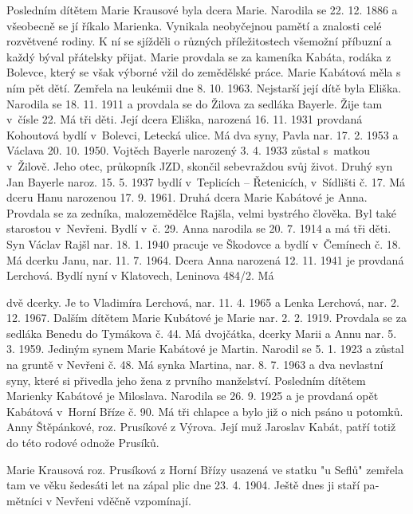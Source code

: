 \documentclass[../dejiny-rodu-prusiku.tex]{subfiles}
\begin{document}
Posledním dítětem Marie Krausové byla dcera Marie. Na­rodila se 22. 12. 1886 a všeobecně se jí říkalo Marienka. Vynikala neobyčejnou pamětí a znalosti celé rozvětvené rodiny. K ní se sjížděli o různých příležitostech všemožní příbuzní a každý býval přátelsky přijat. Marie provda­la se za kameníka Kabáta, rodáka z Bolevce, který se však výborné vžil do zemědělské práce. Marie Kabátová měla s ním pět dětí. Zemřela na leukémii dne 8. 10. 1963. Nejstarší její dítě byla Eliška. Narodila se 18. 11. 1911 a provdala se do Žilova za sedláka Bayerle. Žije tam v čísle 22. Má tři děti. Její dcera Eliška, narozená 16. 11. 1931 provdaná Kohoutová bydlí v Bolevci, Letecká ulice. Má dva syny, Pavla nar. 17. 2. 1953 a Václava 20. 10. 1950. Vojtěch Bayerle narozený 3. 4. 1933 zůstal s matkou v Žilově. Jeho otec, průkopník JZD, skončil sebevraždou svůj život. Druhý syn Jan Bayerle naroz. 15. 5. 1937 bydlí v Teplicích – Řetenicích, v Sídlišti č. 17. Má dceru Hanu narozenou 17. 9. 1961. Druhá dcera Marie Kabátové je Anna. Provdala se za zedníka, malozemědělce Rajšla, velmi bystrého člověka. Byl také starostou v Nevřeni. Bydlí v č. 29. Anna narodila se 20. 7. 1914 a má tři děti. Syn Václav Rajšl nar. 18. 1. 1940 pracuje ve Škodovce a bydlí v Čemínech č. 18. Má dcerku Janu, nar. 11. 7. 1964. Dcera Anna narozená 12. 11. 1941 je provdaná Lerchová. Bydlí nyní v Klatovech, Leninova 484/2. Má

dvě dcerky. Je to Vladimíra Lerchová, nar. 11. 4. 1965 a Lenka Lerchová, nar. 2. 12. 1967. Dalším dítětem Marie Kubátové je Marie  nar. 2. 2. 1919. Provdala se za sedláka Benedu do Tymákova č. 44. Má dvojčátka, dcerky Marii a Annu nar. 5. 3. 1959. Jediným synem Marie Kabá­tové je Martin. Narodil se 5. 1. 1923 a zůstal na gruntě v Nevřeni č. 48. Má synka Martina, nar. 8. 7. 1963 a dva nevlastní syny, které si přivedla jeho žena z prvního manželství. Posledním dítětem Marienky Kabátové je Miloslava. Narodila se 26. 9. 1925 a je provdaná opět Kabátová v Horní Bříze č. 90. Má tři chlapce a bylo již o nich psáno u potomků. Anny Štěpánkové, roz. Prusíkové z Výrova. Její muž Jaroslav Kabát, patří totiž do této rodové odnože Prusíků.

Marie Krausová roz. Prusíková z Horní Břízy usazená ve statku "u Seflů" zemřela tam ve věku šedesáti let na zápal plic dne 23. 4. 1904. Ještě dnes ji staří pa­mětníci v Nevřeni vděčně vzpomínají.
\end{document}
